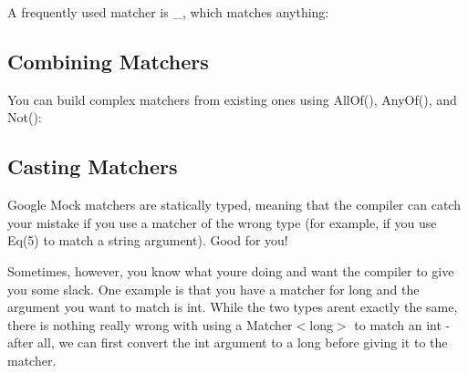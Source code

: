 A frequently used matcher is {\ttfamily \+\_\+}, which matches anything\+:


\begin{DoxyCode}{0}
\end{DoxyCode}


\subsection*{Combining Matchers}

You can build complex matchers from existing ones using {\ttfamily All\+Of()}, {\ttfamily Any\+Of()}, and {\ttfamily Not()}\+:


\begin{DoxyCode}{0}
\DoxyCodeLine{}
\end{DoxyCode}


\subsection*{Casting Matchers}

Google Mock matchers are statically typed, meaning that the compiler can catch your mistake if you use a matcher of the wrong type (for example, if you use {\ttfamily Eq(5)} to match a {\ttfamily string} argument). Good for you!

Sometimes, however, you know what you\textquotesingle{}re doing and want the compiler to give you some slack. One example is that you have a matcher for {\ttfamily long} and the argument you want to match is {\ttfamily int}. While the two types aren\textquotesingle{}t exactly the same, there is nothing really wrong with using a {\ttfamily Matcher$<$long$>$} to match an {\ttfamily int} -\/ after all, we can first convert the {\ttfamily int} argument to a {\ttfamily long} before giving it to the matcher.

